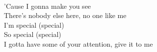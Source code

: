 \\
'Cause I gonna make you see \\
There's nobody else here, no one like me \\
I'm special (special) \\
So special (special) \\
I gotta have some of your attention, give it to me \\
